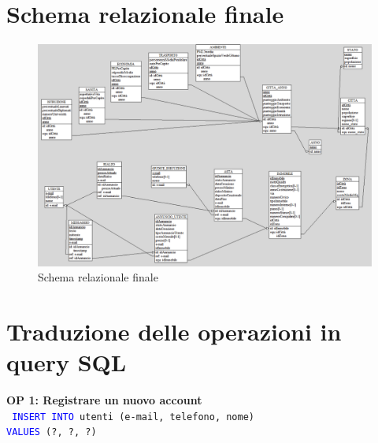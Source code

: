 \documentclass[a4paper,12pt]{report}
\begin{document}
            \section{Schema relazionale finale}
                \begin{figure}[H]
                    \centering{}
                    \includegraphics[width=\linewidth]{./images/relational_scheme.png}
                    \caption{Schema relazionale finale}
            \end{figure}
                
            \section{Traduzione delle operazioni in query SQL}

            \textbf{OP 1: Registrare un nuovo account} \\
            \texttt{
                \textcolor{blue}{INSERT INTO} utenti (e-mail, telefono, nome) \\
                \textcolor{blue}{VALUES} (?, ?, ?) \\
            } 
            
\end{document}
